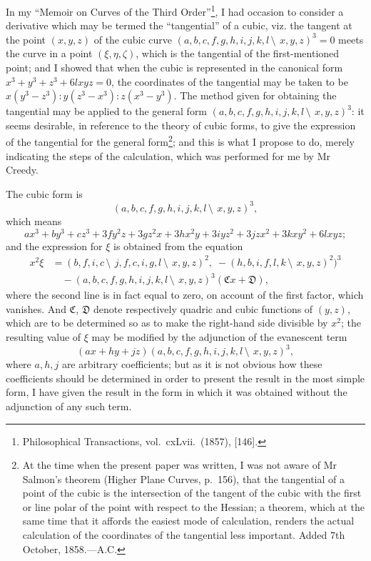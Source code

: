 \documentclass[12pt,a4paper]{article}
\begin{document}
In my ``Memoir on Curves of the Third Order''\footnote{Philosophical Transactions, vol.~cxLvii.~(1857), [146].}, I had occasion to consider a derivative which may be termed the ``tangential'' of a cubic, viz. the tangent at the point $(x, y, z)$ of the cubic curve $(a, b, c, f, g, h, i, j, k, l\,\setminus\!\!\:\, x, y, z)^3 = 0$ meets the curve in a point $(\xi, \eta, \zeta)$, which is the tangential of the first-mentioned point; and I showed that when the cubic is represented in the canonical form $x^3 + y^3 + z^3 + 6lxyz = 0$, the coordinates of the tangential may be taken to be $x(y^3 - z^3) : y(z^3 - x^3) : z(x^3 - y^3)$. The method given for obtaining the tangential may be applied to the general form $(a, b, c, f, g, h, i, j, k, l\,\setminus\!\!\:\, x, y, z)^3$: it seems desirable, in reference to the theory of cubic forms, to give the expression of the tangential for the general form\footnote{At the time when the present paper was written, I was not aware of Mr Salmon's theorem (Higher Plane Curves, p.~156), that the tangential of a point of the cubic is the intersection of the tangent of the cubic with the first or line polar of the point with respect to the Hessian; a theorem, which at the same time that it affords the easiest mode of calculation, renders the actual calculation of the coordinates of the tangential less important. Added 7th October, 1858.---A.C.}; and this is what I propose to do, merely indicating the steps of the calculation, which was performed for me by Mr Creedy.

The cubic form is
\[
(a, b, c, f, g, h, i, j, k, l\,\setminus\!\!\:\, x, y, z)^3,
\]
which means
\[
ax^3 + by^3 + cz^3 + 3fy^2z + 3gz^2x + 3hx^2y + 3iyz^2 + 3jzx^2 + 3kxy^2 + 6lxyz;
\]
and the expression for $\xi$ is obtained from the equation
\begin{align*}
x^2\xi &= (b, f, i, c\,\setminus\!\!\:\, j, f, c, i, g, l\,\setminus\!\!\:\, x, y, z)^2,\; -(h, b, i, f, l, k\,\setminus\!\!\:\, x, y, z)^2)^3\\
&\quad - (a, b, c, f, g, h, i, j, k, l\,\setminus\!\!\:\, x, y, z)^3(\mathfrak{C}x + \mathfrak{D}),
\end{align*}
where the second line is in fact equal to zero, on account of the first factor, which vanishes. And $\mathfrak{C}$, $\mathfrak{D}$ denote respectively quadric and cubic functions of $(y, z)$, which are to be determined so as to make the right-hand side divisible by $x^2$; the resulting value of $\xi$ may be modified by the adjunction of the evanescent term
\[
(ax + hy + jz)(a, b, c, f, g, h, i, j, k, l\,\setminus\!\!\:\, x, y, z)^3,
\]
where $a, h, j$ are arbitrary coefficients; but as it is not obvious how these coefficients should be determined in order to present the result in the most simple form, I have given the result in the form in which it was obtained without the adjunction of any such term.
\end{document}
